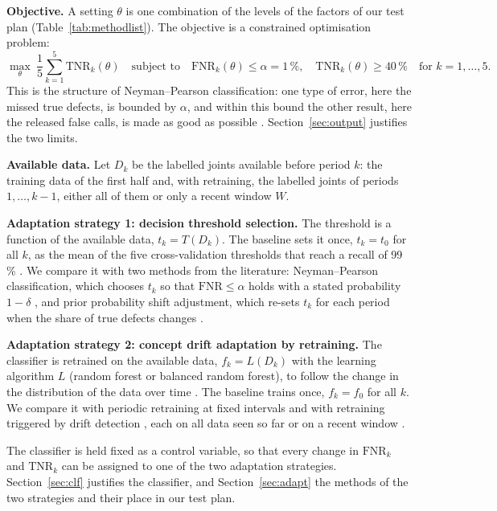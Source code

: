 \documentclass[11pt,a4paper]{article}
\begin{document}
\textbf{Objective.} A setting $\theta$ is one combination of the levels of the factors of our test plan (Table~\ref{tab:methodlist}). The objective is a constrained optimisation problem:
\begin{equation}
\max_{\theta}\ \frac{1}{5}\sum_{k=1}^{5} \mathrm{TNR}_k(\theta) \quad \text{subject to} \quad \mathrm{FNR}_k(\theta) \leq \alpha = 1\,\%, \quad \mathrm{TNR}_k(\theta) \geq 40\,\% \quad \text{for } k = 1, \dots, 5.
\label{eq:objective}
\end{equation}
This is the structure of Neyman--Pearson classification: one type of error, here the missed true defects, is bounded by $\alpha$, and within this bound the other result, here the released false calls, is made as good as possible \cite{tong2018}. Section~\ref{sec:output} justifies the two limits.

\textbf{Available data.} Let $D_k$ be the labelled joints available before period $k$: the training data of the first half and, with retraining, the labelled joints of periods $1, \dots, k-1$, either all of them or only a recent window $W$.

\textbf{Adaptation strategy 1: decision threshold selection.} The threshold is a function of the available data, $t_k = T(D_k)$. The baseline sets it once, $t_k = t_0$ for all $k$, as the mean of the five cross-validation thresholds that reach a recall of 99\,\% \cite{pfab2025}. We compare it with two methods from the literature: Neyman--Pearson classification, which chooses $t_k$ so that $\mathrm{FNR} \leq \alpha$ holds with a stated probability $1-\delta$ \cite{tong2018}, and prior probability shift adjustment, which re-sets $t_k$ for each period when the share of true defects changes \cite{saerens2002}.

\textbf{Adaptation strategy 2: concept drift adaptation by retraining.} The classifier is retrained on the available data, $f_k = L(D_k)$ with the learning algorithm $L$ (random forest or balanced random forest), to follow the change in the distribution of the data over time \cite{gama2014}. The baseline trains once, $f_k = f_0$ for all $k$. We compare it with periodic retraining at fixed intervals \cite{gama2014,dalpozzolo2018,gao2026} and with retraining triggered by drift detection \cite{gama2004}, each on all data seen so far or on a recent window \cite{gama2014}.

The classifier is held fixed as a control variable, so that every change in $\mathrm{FNR}_k$ and $\mathrm{TNR}_k$ can be assigned to one of the two adaptation strategies. Section~\ref{sec:clf} justifies the classifier, and Section~\ref{sec:adapt} the methods of the two strategies and their place in our test plan.
\end{document}
